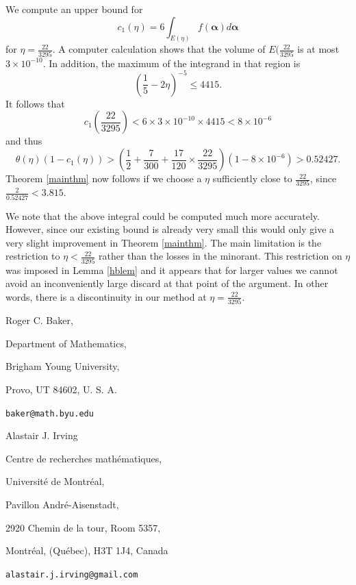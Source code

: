 \documentclass[12pt]{amsart}
\theoremstyle{plain}
\theoremstyle{definition}
\newcommand{\bs}{\boldsymbol}
\numberwithin{equation}{section}
\def \a{\alpha} \def \b{\beta} \def \d{\delta} \def \e{\varepsilon} \def \g{\gamma} \def \k{\kappa} \def \l{\lambda} \def \s{\sigma} \def \t{\theta} \def \z{\zeta}
\begin{document}
We compute an upper bound for 
$$c_1(\eta)=6\int_{E(\eta)} f(\bs \a)d\bs \a$$
for $\eta=\frac{22}{3295}$.  A computer calculation shows that the volume of $E(\frac{22}{3295}$ is at most $3\times 10^{-10}$.  In addition, the maximum of the integrand in that region is 
$$\left(\frac15-2\eta\right)^{-5}\leq 4415.$$
It follows that 
$$c_1(\frac{22}{3295})<6\times 3\times 10^{-10}\times 4415<8\times 10^{-6}$$ 
and thus 
$$\theta(\eta)(1-c_1(\eta))>\left(\frac12+\frac{7}{300}+\frac{17}{120}\times \frac{22}{3295}\right)\left(1-8\times 10^{-6}\right)>0.52427.$$ 
Theorem \ref{mainthm} now follows if we choose a $\eta$ sufficiently close to $\frac{22}{3295}$, since $\frac{2}{0.52427}<3.815$.

We note that the above integral could be computed much more accurately.  However, since our existing bound is already very small this would only give a very slight improvement in Theorem \ref{mainthm}.  The main limitation is the restriction to $\eta<\frac{22}{3295}$ rather than the losses in the minorant.  This restriction on $\eta$ was imposed in Lemma \ref{hblem} and it appears that for larger values we cannot avoid an inconveniently large discard at that point of the argument.  In other words, there is a discontinuity in our method at $\eta=\frac{22}{3295}$.




\newpage
{} 

 


\vspace*{.5cm}

Roger C. Baker,

Department of Mathematics,

Brigham Young University,

Provo, UT 84602, U. S. A.

{\tt baker@math.byu.edu} 
\bigskip 

Alastair J. Irving


Centre de recherches math\'ematiques,

Universit\'e de Montr\'eal,

Pavillon Andr\'e-Aisenstadt,

2920 Chemin de la tour, Room 5357,

Montr\'eal, (Qu\'ebec), H3T 1J4, Canada 



{\tt alastair.j.irving@gmail.com} 
 
\end{document}
